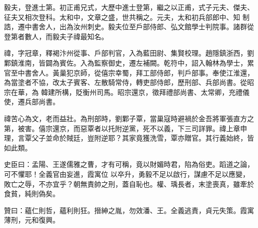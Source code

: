 \begin{pinyinscope}
 毅夫，登進士第。初正甫兄式，大歷中進士登第，繼之以正甫，式子元夫、傑夫、征夫又相次登科。太和中，文章之盛，世共稱之。元夫，太和初兵部郎中、知
 制誥，遷中書舍人，出為汝州刺史。毅夫位至戶部侍郎、弘文館學士判院事。諸群從登第者數人，而毅夫子禕最知名。



 禕，字冠章，釋褐汴州從事、戶部判官，入為藍田尉、集賢校理。趙隱鎮浙西，劉鄴鎮淮南，皆闢為賓佐。入為監察御史，遷左補闕。乾符中，詔入翰林為學士，累官至中書舍人。黃巢犯京師，從僖宗幸蜀，拜工部侍郎，判戶部事。奉使江淮還，為當塗者不協，改太子賓客、左散騎常侍，轉吏部侍郎，歷刑部、兵部尚書。從昭宗在華，為
 韓建所構，貶衡州司馬。昭宗還京，徵拜禮部尚書、太常卿，充禮儀使，遷兵部尚書。



 禕苦心為文，老而益壯。為刑部時，劉鄴子覃，當巢寇時避禍於金吾將軍張直方之第，被害。僖宗還京，而惡覃者以托附逆黨，死不以義，下三司詳罪。禕上章申理，言覃父子並命於賊廷，豈附逆耶？其家竟獲洗雪，覃亦贈官。其行義始終，皆如此類。



 史臣曰：孟陽、王遂儒雅之曹，才有可稱，竟以財媚時君，陷為俗吏。蹈道之論，可不懼耶！全義官由妄進，霞寓位
 以卒升，勇毅不足以啟行，謀慮不足以應變，敗亡之辱，不亦宜乎？朝無責帥之刑，蓋自恥也。權、瑀長者，末塗喪真，雖牽於食貧，純則偽矣。



 贊曰：蘊仁則哲，蘊利則狂。搢紳之胤，勿效潘、王。全義逃責，貞元失策。霞寓薄刑，元和復興。



\end{pinyinscope}